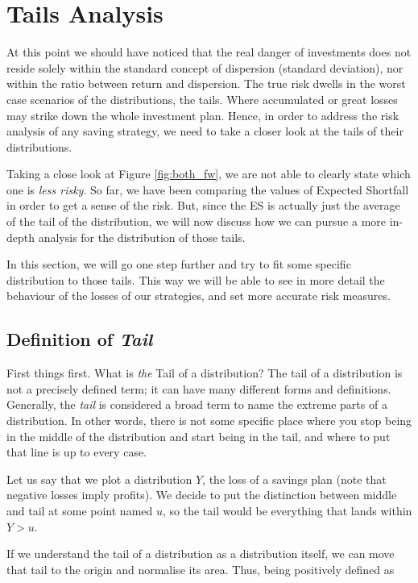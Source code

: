 \section{Tails Analysis}

At this point we should have noticed that the real danger of investments does not reside solely within the standard concept of dispersion (standard deviation), nor within the ratio between return and dispersion. The true risk dwells in the worst case scenarios of the distributions, the tails. Where accumulated or great losses may strike down the whole investment plan. Hence, in order to address the risk analysis of any saving strategy, we need to take a closer look at the tails of their distributions.


Taking a close look at Figure \ref{fig:both_fw}, we are not able to clearly state which one is \textit{less risky}. So far, we have been comparing the values of Expected Shortfall in order to get a sense of the risk. But, since the ES is actually just the average of the tail of the distribution, we will now discuss how we can pursue a more in-depth analysis for the distribution of those tails.

In this section, we will go one step further and try to fit some specific distribution to those tails. This way we will be able to see in more detail the behaviour of the losses of our strategies, and set more accurate risk measures.

\subsection{Definition of \textit{Tail}}

First things first. What is \emph{the} Tail of a distribution? The tail of a distribution is not a precisely defined term; it can have many different forms and definitions. Generally, the \textit{tail} is considered a broad term to name the extreme parts of a distribution. In other words, there is not some specific place where you stop being in the middle of the distribution and start being in the tail, and where to put that line is up to every case.

Let us say that we plot a distribution $Y$, the loss of a savings plan (note that negative losses imply profits). We decide to put the distinction between middle and tail at some point named $u$, so the tail would be everything that lands within $Y>u$.

If we understand the tail of a distribution as a distribution itself, we can move that tail to the origin and normalise its area. Thus, being positively defined as

